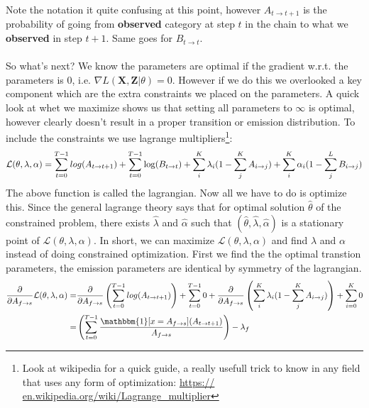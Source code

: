 Note the notation it quite confusing at this point, however $A_{t\rightarrow t+1}$ is the probability of going from \textbf{observed} category at step $t$ in the chain to what we \textbf{observed} in step $t+1$. Same goes for $B_{t\rightarrow t}$.\\\\
So what's next? We know the parameters are optimal if the gradient w.r.t. the parameters is 0, i.e. $\nabla L(\textbf{X},\textbf{Z}|\theta) = 0$. However if we do this we overlooked a key component which are the extra constraints we placed on the parameters. A quick look at whet we maximize shows us that setting all parameters to $\infty$ is optimal, however clearly doesn't result in a proper transition or emission distribution. To include the constraints we use lagrange multipliers\footnote{Look at wikipedia for a quick guide, a really usefull trick to know in any field that uses any form of optimization: \url{https:// en.wikipedia.org/wiki/Lagrange_multiplier}}:
\begin{equation}
	\mathcal{L}(\theta, \lambda, \alpha) = \sum_{t=0}^{T-1} log(A_{t\rightarrow t+1}) + \sum_{t=0}^{T-1} \log(B_{t\rightarrow t})\\
	+\sum_{i}^{K}\lambda_i(1-\sum_{j}^{K}A_{i\rightarrow j}) +\sum_{i}^{K}\alpha_i(1-\sum_{j}^{L}B_{i \rightarrow j})
\end{equation}
The above function is called the lagrangian. Now all we have to do is optimize this. Since the general lagrange theory says that for optimal solution $\hat{\theta}$ of the constrained problem, there exists $\hat{\lambda}$ and $\hat{\alpha}$ such that $(\hat{\theta},\hat{\lambda}, \hat{\alpha})$ is a stationary point of $\mathcal{L}(\theta, \lambda, \alpha)$. In short, we can maximize $\mathcal{L}(\theta, \lambda, \alpha)$ and find $\lambda$ and $\alpha$ instead of doing constrained optimization. First we find the the optimal transtion parameters, the emission parameters are identical by symmetry of the lagrangian.
\begin{equation}
		\begin{split}		
		\frac{\partial}{\partial A_{f\rightarrow s}}\mathcal{L}(\theta, \lambda, \alpha) =& \frac{\partial}{\partial A_{f\rightarrow s}}\left(\sum_{t=0}^{T-1} log(A_{t\rightarrow t+1})\right) + \sum_{t=0}^{T-1}0 + \frac{\partial}{\partial A_{f\rightarrow s}}\left( \sum_{i}^{K}\lambda_i(1-\sum_{j}^{K}A_{i\rightarrow j})\right)+\sum_{i=0}^{K}0\\
		=&  \left(\sum_{t=0}^{T-1} \frac{\mathbbm{1}[x = A_{f\rightarrow s}](A_{t\rightarrow t+1})}{A_{f\rightarrow s}}\right) - \lambda_{f}
		\end{split}
\end{equation}

